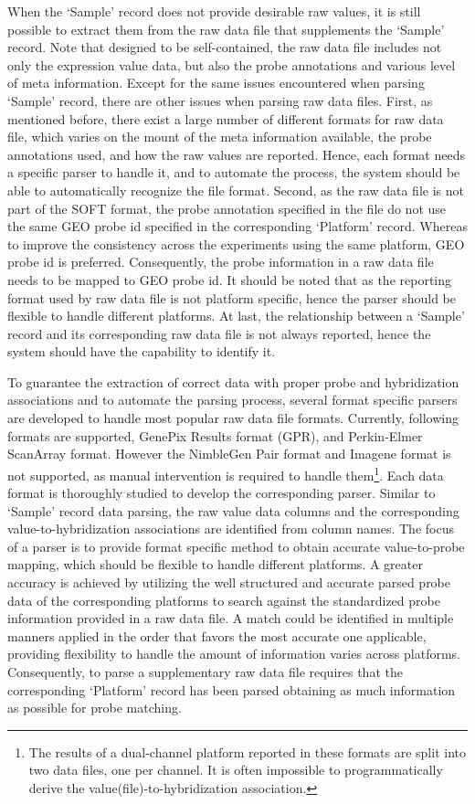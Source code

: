 When the `Sample' record does not provide desirable raw values, it is still possible to extract them from the raw data file that supplements the `Sample' record. Note that designed to be self-contained, the raw data file includes not only the expression value data, but also the probe annotations and various level of meta information. Except for the same issues encountered when parsing `Sample' record, there are other issues when parsing raw data files. First, as mentioned before, there exist a large number of different formats for raw data file, which varies on the mount of the meta information available, the probe annotations used, and how the raw values are reported. Hence, each format needs a specific parser to handle it, and to automate the process, the system should be able to automatically recognize the file format. Second, as the raw data file is not part of the SOFT format, the probe annotation specified in the file do not use the same GEO probe id specified in the corresponding `Platform' record. Whereas to improve the consistency across the experiments using the same platform, GEO probe id is preferred. Consequently, the probe information in a raw data file needs to be mapped to GEO probe id. It should be noted that as the reporting format used by raw data file is not platform specific, hence the parser should be flexible to handle different platforms. At last, the relationship between a `Sample' record and its corresponding raw data file is not always reported, hence the system should have the capability to identify it. 

To guarantee the extraction of correct data with proper probe and hybridization associations and to automate the parsing process, several format specific parsers are developed to handle most popular raw data file formats. Currently, following formats are supported, GenePix Results format (GPR), and Perkin-Elmer ScanArray format.   However the NimbleGen Pair format and Imagene format is not supported, as manual intervention is required to handle them\footnote{The results of a   dual-channel platform reported in these formats are split into two data   files, one per channel.  It is often impossible to programmatically derive   the value(file)-to-hybridization association.}. Each data format is thoroughly studied to develop the corresponding parser. Similar to `Sample' record data parsing, the raw value data columns and the corresponding value-to-hybridization associations are identified from column names. The focus of a parser is to provide format specific method to obtain accurate value-to-probe mapping, which should be flexible to handle different platforms. A greater accuracy is achieved by utilizing the well structured and accurate parsed probe data of the corresponding platforms to search against the standardized probe information provided in a raw data file. A match could be identified in multiple manners applied in the order that favors the most accurate one applicable, providing flexibility to handle the amount of information varies across platforms. Consequently, to parse a supplementary raw data file requires that the corresponding `Platform' record has been parsed obtaining as much information as possible for probe matching. 

